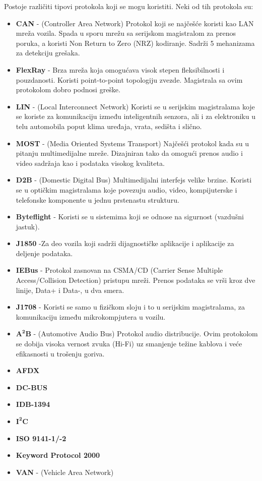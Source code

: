 \documentclass[a4paper]{article}
\begin{document}
Postoje različiti tipovi protokola koji se mogu koristiti. Neki od tih protokola su:

\begin{itemize}

\item \textbf{CAN} - (Controller Area Network) Protokol koji se najčešće koristi kao LAN mreža vozila. Spada u sporu mrežu sa serijskom magistralom za prenos poruka, a koristi Non Return to Zero (NRZ) kodiranje. Sadrži 5 mehanizama za detekciju grešaka. %
\item \textbf{FlexRay} - Brza mreža koja omogućava visok stepen fleksibilnosti i pouzdanosti. Koristi point-to-point topologiju zvezde. Magistrala sa ovim protokolom dobro podnosi greške. %
\item \textbf{LIN} - (Local Interconnect Network) Koristi se u serijskim magistralama koje se koriste za komunikaciju između inteligentnih senzora, ali i za elektroniku u telu automobila poput klima uređaja, vrata, sedišta i slično. %
\item \textbf{MOST} - (Media Oriented Systems Transport) Najčešći protokol kada su u pitanju multimedijalne mreže. Dizajniran tako da omogući prenos audio i video sadržaja kao i podataka visokog kvaliteta. %
\item \textbf{D2B} - (Domestic Digital Bus) Multimedijalni interfejs velike brzine. Koristi se u optičkim magistralama koje povezuju audio, video, kompijuterske i telefonske komponente u jednu prstenastu strukturu. %
\item \textbf{Byteflight} - Koristi se u sistemima koji se odnose na sigurnost (vazdušni jastuk). %
\item \textbf{J1850} -Za deo vozila koji sadrži dijagnostičke aplikacije i aplikacije za deljenje podataka. %
\item \textbf{IEBus} - Protokol zasnovan na CSMA/CD (Carrier Sense Multiple Access/Collision Detection) pristupu mreži. Prenos podataka se vrši kroz dve linije, Data+ i Data-, u dva smera. %
\item \textbf{J1708} - Koristi se samo u fizičkom sloju i to u serijskim magistralama, za komunikaciju između mikrokompjutera u vozilu. %
\cite{viseujednom}

\item $\mathbf{A^{2}B}$ - (Automotive Audio Bus) Protokol audio distribucije. Ovim protokolom se dobija visoka vernost zvuka (Hi-Fi) uz smanjenje težine kablova i veće efikasnosti u trošenju goriva.  \cite{AB}
\item \textbf{AFDX} \cite{AFDX} 
\item \textbf{DC-BUS} \cite{DC-BUS} 
\item \textbf{IDB-1394} \cite{IDB-1394} 
\item $\mathbf{I^{2}C}$ \cite{IC}  
\item \textbf{ISO 9141-1/-2} \cite{ISO 9141-1/-2} 
\item \textbf{Keyword Protocol 2000} \cite{KeywordProtoco} 
\item \textbf{VAN} - (Vehicle Area Network) \cite{VAN}

\end{itemize}
\end{document}

